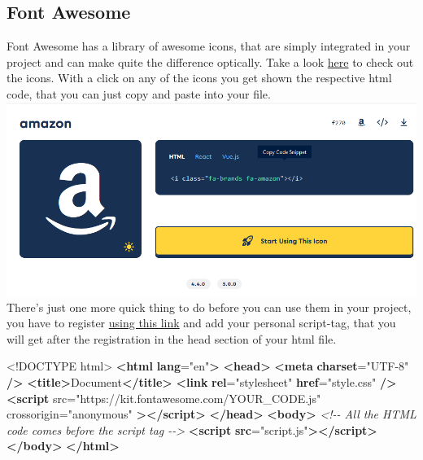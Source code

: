 \documentclass[
]{article}
\newenvironment{Shaded}{\begin{snugshade}}{\end{snugshade}}
\newcommand{\CommentTok}[1]{\textcolor[rgb]{0.56,0.35,0.01}{\textit{#1}}}
\newcommand{\DataTypeTok}[1]{\textcolor[rgb]{0.13,0.29,0.53}{#1}}
\newcommand{\ErrorTok}[1]{\textcolor[rgb]{0.64,0.00,0.00}{\textbf{#1}}}
\newcommand{\KeywordTok}[1]{\textcolor[rgb]{0.13,0.29,0.53}{\textbf{#1}}}
\newcommand{\NormalTok}[1]{#1}
\newcommand{\OtherTok}[1]{\textcolor[rgb]{0.56,0.35,0.01}{#1}}
\newcommand{\StringTok}[1]{\textcolor[rgb]{0.31,0.60,0.02}{#1}}
\begin{document}
\hypertarget{font-awesome}{%
\subsection{Font Awesome}\label{font-awesome}}

Font Awesome has a library of awesome icons, that are simply integrated in your project and can make quite the difference optically.
Take a look \href{https://fontawesome.com/search?m=free}{here} to check out the icons. With a click on any of the icons you get shown the respective html code, that you can just copy and paste into your file.
\includegraphics{docs/assets/font-awesome.png}
There's just one more quick thing to do before you can use them in your project, you have to register \href{https://fontawesome.com/v6/docs/web/setup/get-started}{using this link} and add your personal script-tag, that you will get after the registration in the head section of your html file.

\begin{Shaded}
\begin{Highlighting}[]
\DataTypeTok{\textless{}!DOCTYPE }\NormalTok{html}\DataTypeTok{\textgreater{}}
\KeywordTok{\textless{}html} \ErrorTok{lang}\OtherTok{=}\StringTok{"en"}\KeywordTok{\textgreater{}}
  \KeywordTok{\textless{}head\textgreater{}}
    \KeywordTok{\textless{}meta} \ErrorTok{charset}\OtherTok{=}\StringTok{"UTF{-}8"} \KeywordTok{/\textgreater{}}
    \KeywordTok{\textless{}title\textgreater{}}\NormalTok{Document}\KeywordTok{\textless{}/title\textgreater{}}
    \KeywordTok{\textless{}link} \ErrorTok{rel}\OtherTok{=}\StringTok{"stylesheet"} \ErrorTok{href}\OtherTok{=}\StringTok{"style.css"} \KeywordTok{/\textgreater{}}
    \KeywordTok{\textless{}script}
\OtherTok{      src=}\StringTok{"https://kit.fontawesome.com/YOUR\_CODE.js"}
\OtherTok{      crossorigin=}\StringTok{"anonymous"}
    \KeywordTok{\textgreater{}\textless{}/script\textgreater{}}
  \KeywordTok{\textless{}/head\textgreater{}}
  \KeywordTok{\textless{}body\textgreater{}}
    \CommentTok{\textless{}!{-}{-} All the HTML code comes before the script tag {-}{-}\textgreater{}}
    \KeywordTok{\textless{}script} \ErrorTok{src}\OtherTok{=}\StringTok{"script.js"}\KeywordTok{\textgreater{}\textless{}/script\textgreater{}}
  \KeywordTok{\textless{}/body\textgreater{}}
\KeywordTok{\textless{}/html\textgreater{}}
\end{Highlighting}
\end{Shaded}
\end{document}
